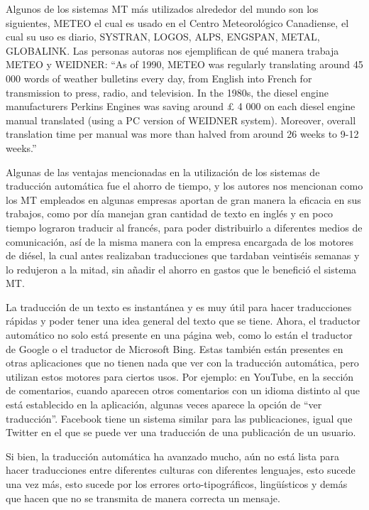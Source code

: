 \documentclass[conference]{IEEEtran}
\begin{document}
 
Algunos de los sistemas MT más utilizados alrededor del mundo son los siguientes, METEO el cual es usado en el Centro Meteorológico Canadiense, el cual su uso es diario, SYSTRAN, LOGOS, ALPS, ENGSPAN, METAL, GLOBALINK. Las personas autoras nos ejemplifican de qué manera trabaja METEO y WEIDNER:
“As of 1990, METEO was regularly translating around 45 000 words of weather bulletins every day, from English into French for transmission to press, radio, and television. In the 1980s, the diesel engine manufacturers Perkins Engines was saving around £ 4 000 on each diesel engine manual translated (using a PC version of WEIDNER system). Moreover, overall translation time per manual was more than halved from around 26 weeks to 9-12 weeks.”\cite{b1}

Algunas de las ventajas mencionadas en la utilización de los sistemas de traducción automática fue el ahorro de tiempo, y los autores nos mencionan como los MT empleados en algunas empresas aportan de gran manera la eficacia en sus trabajos, como por día manejan gran cantidad de texto en inglés y en poco tiempo lograron traducir al francés, para poder distribuirlo a diferentes medios de comunicación, así  de la misma manera con la empresa encargada de los motores de diésel, la cual antes realizaban traducciones que tardaban veintiséis semanas y lo redujeron a la mitad, sin añadir el ahorro en gastos que le benefició el sistema MT.

	La traducción de un texto es instantánea y es muy útil para hacer traducciones rápidas y poder tener una idea general del texto que se tiene. Ahora, el traductor automático no solo está presente en una página web, como lo están el traductor de Google o el traductor de Microsoft Bing. Estas también están presentes en otras aplicaciones que no tienen nada que ver con la traducción automática, pero utilizan estos motores para ciertos usos. Por ejemplo: en YouTube, en la sección de comentarios, cuando aparecen otros comentarios con un idioma distinto al que está establecido en la aplicación, algunas veces aparece la opción de “ver traducción”. Facebook tiene un sistema similar para las publicaciones, igual que Twitter en el que se puede ver una traducción de una publicación de un usuario.
 
	Si bien, la traducción automática ha avanzado mucho, aún no está lista para hacer traducciones entre diferentes culturas con diferentes lenguajes, esto sucede una vez más, esto sucede por los errores orto-tipográficos, lingüísticos y demás que hacen que no se transmita de manera correcta un mensaje.
 
\end{document}
